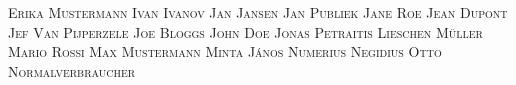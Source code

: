 \documentclass[12pt,a4paper]{article}
\newcommand{\cover}[1]{\mbox{}\newpage\mbox{}\vfill \textsc{#1} \vfill\vfill\newpage}
\begin{document}
\centering\huge
\cover{Erika Mustermann}%
\cover{Ivan Ivanov}%
\cover{Jan Jansen}%
\cover{Jan Publiek}%
\cover{Jane Roe}%
\cover{Jean Dupont}%
\cover{Jef Van Pijperzele}%
\cover{Joe Bloggs}%
\cover{John Doe}%
\cover{Jonas Petraitis}%
\cover{Lieschen Müller}%
\cover{Mario Rossi}%
\cover{Max Mustermann}%
\cover{Minta János}%
\cover{Numerius Negidius}%
\cover{Otto Normalverbraucher}%
\end{document}
